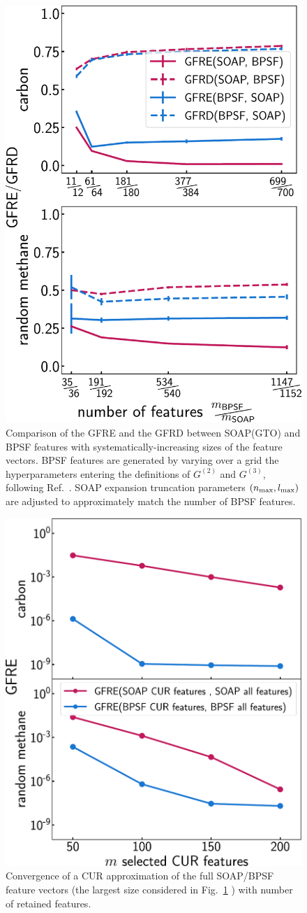 
\begin{figure}
    \centering
    \includegraphics[width=0.45\linewidth]{fig/rof/symmetry_function_comparison-carbon_methane-updated_gfrd-inkscaped.pdf}
    \caption{Comparison of the GFRE and the GFRD between SOAP(GTO) and BPSF features with systematically-increasing sizes of the feature vectors. BPSF features are generated by varying over a grid the hyperparameters entering the definitions of $G^{(2)}$ and $G^{(3)}$, following Ref.~. SOAP expansion truncation parameters $(n_\mathrm{max},l_\mathrm{max})$ are adjusted to approximately match the number of BPSF features.}
    \label{fig:soap_behler_parinello}
\end{figure}


\begin{figure}
    \centering
    \includegraphics[width=0.45\linewidth]{fig/rof/feature_select_convergence_comparison-soap_bpsf-carbon_methane-inkscaped.pdf}
    \caption{Convergence of a CUR approximation of the full SOAP/BPSF feature vectors (the largest size considered in Fig.~\ref{fig:soap_behler_parinello} )  with number of retained features.}
    \label{fig:soap_behler_parinello-convergence}
\end{figure}

